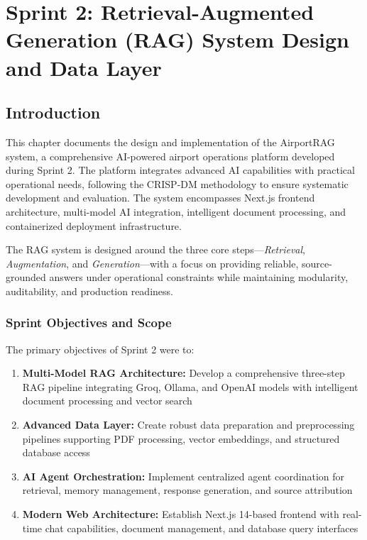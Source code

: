 \chapter{Sprint 2: Retrieval-Augmented Generation (RAG) System Design and Data Layer}
\label{chap:sprint2_rag_design}

\section{Introduction}
\label{sec:intro_s2}

This chapter documents the design and implementation of the AirportRAG system, a comprehensive AI-powered airport operations platform developed during Sprint 2. The platform integrates advanced AI capabilities with practical operational needs, following the CRISP-DM methodology to ensure systematic development and evaluation. The system encompasses Next.js frontend architecture, multi-model AI integration, intelligent document processing, and containerized deployment infrastructure.

The RAG system is designed around the three core steps—\emph{Retrieval}, \emph{Augmentation}, and \emph{Generation}—with a focus on providing reliable, source-grounded answers under operational constraints while maintaining modularity, auditability, and production readiness.

\subsection{Sprint Objectives and Scope}
The primary objectives of Sprint 2 were to:
\begin{enumerate}
    \item \textbf{Multi-Model RAG Architecture:} Develop a comprehensive three-step RAG pipeline integrating Groq, Ollama, and OpenAI models with intelligent document processing and vector search
    \item \textbf{Advanced Data Layer:} Create robust data preparation and preprocessing pipelines supporting PDF processing, vector embeddings, and structured database access
    \item \textbf{AI Agent Orchestration:} Implement centralized agent coordination for retrieval, memory management, response generation, and source attribution
    \item \textbf{Modern Web Architecture:} Establish Next.js 14-based frontend with real-time chat capabilities, document management, and database query interfaces
\end{enumerate}

